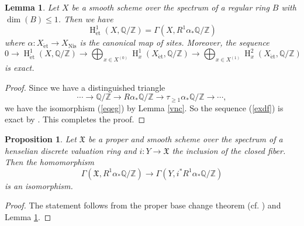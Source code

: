 \documentclass{article}
\newtheorem{prop}[thm]{\indent \sc Proposition}
\newtheorem{lem}[thm]{\indent \sc Lemma}
\newcommand{\et}{\mathrm{\acute{e}t}}
\newcommand{\Nis}{\mathrm{Nis}}
\newcommand{\HO}{\operatorname{H}}
\begin{document}
%
\begin{lem}\upshape\label{smdf}
Let $X$ be a smooth scheme over the spectrum of a regular ring $B$ with 
$\operatorname{dim}(B)\leq 1$. 
Then 
we have
%
\begin{equation}\label{eqeg}
\HO^{1}_{\et}(
X,
\mathbb{Q}/\mathbb{Z}
)    
=
\Gamma\left(
X,
R^{1}\alpha_{*}\mathbb{Q}/\mathbb{Z}
\right)
\end{equation}
%
where $\alpha: X_{\et}\to X_{\Nis}$ is 
the canonical map of sites.
Moreover, the sequence  
%
\begin{equation}\label{exdf}
0\to 
\HO^{1}_{\et}(X, \mathbb{Q}/\mathbb{Z})
\to
\bigoplus_{x\in X^{(0)}}
\HO^{1}_{x}(
X_{\et},
\mathbb{Q}/\mathbb{Z}
)
\to
\bigoplus_{x\in X^{(1)}}
\HO^{2}_{x}(
X_{\et},
\mathbb{Q}/\mathbb{Z}
)
\end{equation}
%
is exact.
\end{lem}
%

%
\begin{proof}\upshape
Since we have a distinguished triangle
%
\begin{equation*}
\cdots\to  
\mathbb{Q}/\mathbb{Z}
\to 
R\alpha_{*}\mathbb{Q}/\mathbb{Z}
\to
\tau_{\geq 1}\alpha_{*}\mathbb{Q}/\mathbb{Z}
\to\cdots,
\end{equation*}
%
we have the isomorphism (\ref{eqeg}) by Lemma \ref{vnc}.
So the sequence (\ref{exdf}) is exact by \cite[p.30, Theorem 1.1]{SM}. 
This completes the proof.
\end{proof}
%


%
\begin{prop}\upshape
Let $\mathfrak{X}$ be a proper and smooth scheme
over the spectrum of a henselian discrete valuation ring
and $i: Y\to \mathfrak{X}$
the inclusion of the closed fiber. Then the homomorphism
%
\begin{equation*}
\Gamma\left(
\mathfrak{X},
R^{1}\alpha_{*}\mathbb{Q}/\mathbb{Z}
\right)
\to
\Gamma\left(
Y,
i^{*}R^{1}\alpha_{*}\mathbb{Q}/\mathbb{Z}
\right)
\end{equation*}
%
is an isomorphism.
\end{prop}
%

%
\begin{proof}
The statement follows from the proper base change theorem (cf. \cite[p.224, VI, Corollary 2.7]{M}) and Lemma \ref{smdf}.    
\end{proof}
%
\end{document}
